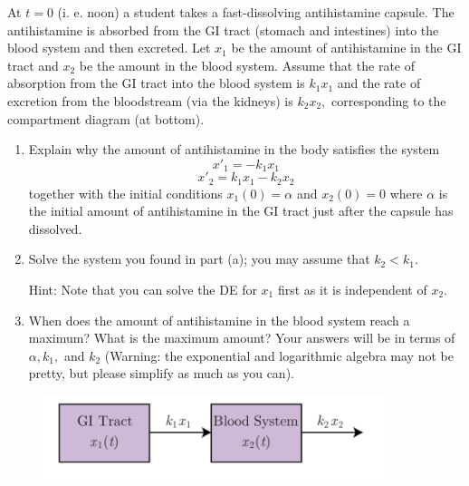 \begin{problem}[4]
At $t = 0$ (i. e. noon) a student takes a fast-dissolving antihistamine capsule. The antihistamine is absorbed from the GI tract (stomach and intestines) into the blood system and then excreted. Let $x_1$ be the amount of antihistamine in the GI tract and $x_2$ be the amount in the blood system. Assume that the rate of absorption from the GI tract into the blood system is $k_1x_1$ and the rate of excretion from the bloodstream (via the kidneys) is $k_2x_2,$ corresponding to the compartment diagram (at bottom).

\begin{enumerate}
\item Explain why the amount of antihistamine in the body satisfies the system 
\[x'_1 = -k_1x_1\]
\[x'_2 =k_1x_1-k_2x_2\]
together with the initial conditions $x_1(0) = \alpha$ and $x_2(0) = 0$ where $\alpha$ is the initial
amount of antihistamine in the GI tract just after the capsule has dissolved.
\item Solve the system you found in part (a); you may assume that $k_2 < k_1$.

Hint: Note that you can solve the DE for $x_1$ first as it is independent of $x_2$.
\item When does the amount of antihistamine in the blood system reach a maximum? What is the maximum amount? Your answers will be in terms of $\alpha, k_1,$ and $k_2$ (Warning: the exponential and logarithmic algebra may not be pretty, but please simplify as much as you can).
\end{enumerate}
\end{problem}

\begin{figure}[ht!]
\centering
\includegraphics[width=100mm]{7p4.jpg}
\end{figure}

\newpage


